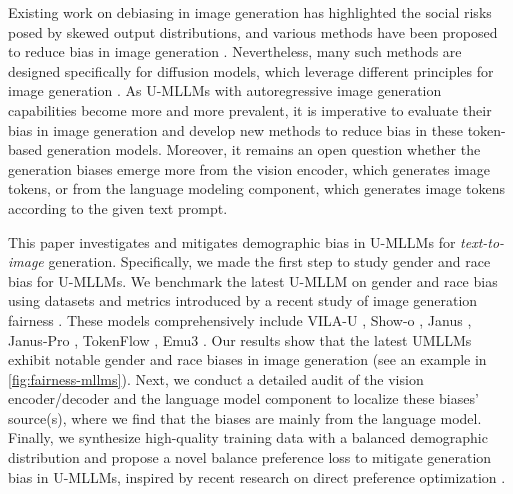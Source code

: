 Existing work on debiasing in image generation has highlighted the social risks posed by skewed output distributions, and various methods have been proposed to reduce bias in image generation \cite{chuang2023debiasingvisionlanguagemodelsbiased,bansal2022texttoimagegenerativemodelsunderstand,wang2024conceptalgebrascorebasedtextcontrolled,gandikota2024unifiedconcepteditingdiffusion}. 
Nevertheless, many such methods are designed specifically for diffusion models, which leverage different principles for image generation \cite{shen2024finetuningtexttoimagediffusionmodels, gandikota2024unifiedconcepteditingdiffusion}. 
As U-MLLMs with autoregressive image generation capabilities become more and more prevalent, it is imperative to evaluate their bias in image generation and develop new methods to reduce bias in these token-based generation models. Moreover, it remains an open question whether the generation biases emerge more from the vision encoder, which generates image tokens, or from the language modeling component, which generates image tokens according to the given text prompt.


This paper investigates and mitigates demographic bias in U-MLLMs for \emph{text-to-image} generation. Specifically, we made the first step to study gender and race bias for U-MLLMs. We benchmark the latest U-MLLM on gender and race bias using datasets and metrics introduced by a recent study of image generation fairness \cite{shen2024finetuningtexttoimagediffusionmodels}. 
These models comprehensively include VILA-U \cite{wu2024vila}, Show-o \cite{xie2024showo}, Janus \cite{wu2024janus}, Janus-Pro \cite{chen2025januspro}, TokenFlow \cite{qu2024tokenflow}, Emu3 \cite{wang2024emu3}. 
Our results show that the latest UMLLMs exhibit notable gender and race biases in image generation (see an example in \autoref{fig:fairness-mllms}). Next, we conduct a detailed audit of the vision encoder/decoder and the language model component to localize these biases' source(s), where we find that the biases are mainly from the language model. Finally, we synthesize high-quality training data with a balanced demographic distribution and propose a novel balance preference loss to mitigate generation bias in U-MLLMs, inspired by recent research on direct preference optimization \cite{rafailov2024direct, hong2024orpomonolithicpreferenceoptimization}. 


